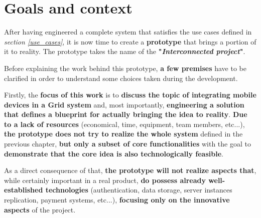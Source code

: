 \section{Goals and context}
After having engineered a complete system that satisfies the use cases defined in \textit{section \ref{use_cases}}, it is now time to create a \textbf{prototype} that brings a portion of it to reality. The prototype takes the name of the \textbf{"\textit{Interconnected project}"}.

Before explaining the work behind this prototype, \textbf{a few premises} have to be clarified in order to understand some choices taken during the development.

Firstly, the \textbf{focus of this work} is to \textbf{discuss the topic of integrating mobile devices in a Grid system} and, most importantly, \textbf{engineering a solution that defines a blueprint for actually bringing the idea to reality}. \textbf{Due to a lack of resources} (economical, time, equipment, team members, etc...), \textbf{the prototype does not try to realize the whole system} defined in the previous chapter, \textbf{but only a subset of core functionalities} with the goal to \textbf{demonstrate that the core idea is also technologically feasible}.

As a direct consequence of that, \textbf{the prototype will not realize aspects that}, while certainly important in a real product, \textbf{do possess already well-established technologies} (authentication, data storage, server instances replication, payment systems, etc...), \textbf{focusing only on the innovative aspects} of the project.
